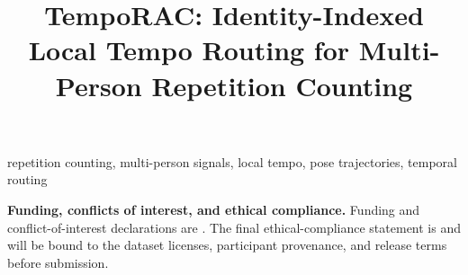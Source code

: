 \documentclass{article}
\title{TempoRAC: Identity-Indexed Local Tempo Routing for Multi-Person Repetition Counting}
\begin{document}
\ninept
\maketitle
\draftbanner

\begin{abstract}

\end{abstract}

\begin{keywords}
repetition counting, multi-person signals, local tempo, pose trajectories,
temporal routing
\end{keywords}







\noindent\textbf{Funding, conflicts of interest, and ethical compliance.}
Funding and conflict-of-interest declarations are .
The final ethical-compliance statement is  and will
be bound to the dataset licenses, participant provenance, and release terms
before submission.

{\small


}
\end{document}
